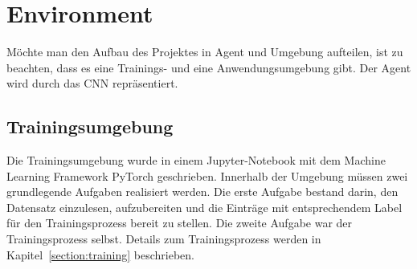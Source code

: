 \documentclass[sigconf]{acmart}
\begin{document}
\section{Environment}
Möchte man den Aufbau des Projektes in Agent und Umgebung aufteilen, ist zu beachten, dass es eine Trainings- und eine Anwendungsumgebung gibt. Der Agent wird durch das CNN repräsentiert. 

\subsection{Trainingsumgebung}
\label{section:Umgebung}
Die Trainingsumgebung wurde in einem Jupyter-Notebook mit dem Machine Learning Framework PyTorch geschrieben. Innerhalb der Umgebung müssen zwei grundlegende Aufgaben realisiert werden. 
Die erste Aufgabe bestand darin, den Datensatz einzulesen, aufzubereiten und die Einträge mit entsprechendem Label für den Trainingsprozess bereit zu stellen. Die zweite Aufgabe war der Trainingsprozess selbst. Details zum Trainingsprozess werden in Kapitel~\ref{section:training} beschrieben. 
\end{document}
